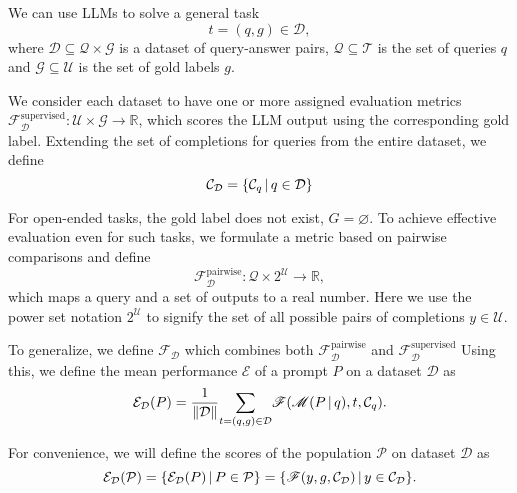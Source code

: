 We can use LLMs to solve a general task
\begin{equation}
    t = (q, g) \in \mathcal{D},
\end{equation}
where $\mathcal{D} \subseteq \mathcal{Q} \times \mathcal{G}$ is a dataset of query-answer pairs, $\mathcal{Q}\subseteq\mathcal{T}$ is the set of queries $q$
and $\mathcal{G}\subseteq\mathcal{U}$ is the set of gold labels $g$.

We consider each dataset to have one or more assigned evaluation metrics $\mathscr{F}_{\mathcal{D}}^{\text{supervised}}: \mathcal{U} \times \mathcal{G} \rightarrow \mathbb{R}$,
which scores the LLM output using the corresponding gold label. 
Extending the set of completions for queries from the entire dataset, we define
\begin{equation}
    \mathcal{C}_{\mathcal{D}} = \{\mathcal{C}_{q}\, \vert \, q \in \mathcal{D}\}
\end{equation}

For open-ended tasks, the gold label does not exist, $G = \varnothing$. To achieve effective evaluation even for such tasks, 
we formulate a metric based on pairwise comparisons and define
\begin{equation}
    \mathscr{F}_{\mathcal{D}}^{\text{pairwise}}: \mathcal{Q} \times 2^\mathcal{U} \rightarrow \mathbb{R},
\end{equation}
which maps a query and a set of outputs to a real number. Here we use the power set notation $2^\mathcal{U}$ to signify the set of all possible pairs of completions $y \in \mathcal{U}$.

To generalize, we define $\mathscr{F}_{\mathcal{D}}$ which combines both $\mathscr{F}_{\mathcal{D}}^{\text{pairwise}}$ and $\mathscr{F}_{\mathcal{D}}^{\text{supervised}}$
Using this, we define the mean performance $\mathcal{E}$ of a prompt $P$ on a dataset $\mathcal{D}$ as
\begin{equation}
    \mathcal{E}_{\mathcal{D}}(P) = \frac{1}{\Vert \mathcal{D} \Vert}\underset{t=(q,g)\in \mathcal{D}}{\sum}\mathscr{F}(\mathscr{M}(P\, \vert \, q), t, \mathcal{C}_{q}).
\end{equation}

For convenience, we will define the scores of the population $\mathcal{P}$ on dataset $\mathcal{D}$ as
\begin{equation}
    \mathcal{E}_{\mathcal{D}}(\mathcal{P}) = \{\mathcal{E}_{\mathcal{D}}(P)\, \vert \, P\in \mathcal{P}\} = \{\mathscr{F}(y, g, \mathcal{C}_{\mathcal{D}})\, \vert \, y \in \mathcal{C}_{\mathcal{D}}\}.
\end{equation}

